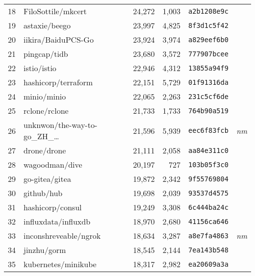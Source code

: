 {\begin{supertabular}{llrrll}
        18  &                 FiloSottile/mkcert & 24,272 &  1,003 &  \texttt{a2b1208e9c} &              \\
        19  &                      astaxie/beego & 23,997 &  4,825 &  \texttt{8f3d1c5f42} &              \\
        20  &                 iikira/BaiduPCS-Go & 23,924 &  3,974 &  \texttt{a829eef6b0} &              \\
        21  &                       pingcap/tidb & 23,680 &  3,572 &  \texttt{777907bcee} &              \\
        22  &                        istio/istio & 22,946 &  4,312 &  \texttt{13855a94f9} &              \\
        23  &                hashicorp/terraform & 22,151 &  5,729 &  \texttt{01f91316da} &              \\
        24  &                        minio/minio & 22,065 &  2,263 &  \texttt{231c5cf6de} &              \\
        25  &                      rclone/rclone & 21,733 &  1,733 &  \texttt{764b90a519} &              \\
        26  &  unknwon/the-way-to-go\_ZH\_\ldots & 21,596 &  5,939 &  \texttt{eec6f83fcb} &  \textit{nm} \\
        27  &                        drone/drone & 21,111 &  2,058 &  \texttt{aa84e311c0} &              \\
        28  &                     wagoodman/dive & 20,197 &    727 &  \texttt{103b05f3c0} &              \\
        29  &                     go-gitea/gitea & 19,872 &  2,342 &  \texttt{9f55769804} &              \\
        30  &                         github/hub & 19,698 &  2,039 &  \texttt{93537d4575} &              \\
        31  &                   hashicorp/consul & 19,249 &  3,308 &  \texttt{6c444ba24c} &              \\
        32  &                influxdata/influxdb & 18,970 &  2,680 &  \texttt{41156ca646} &              \\
        33  &              inconshreveable/ngrok & 18,634 &  3,287 &  \texttt{a8e7fa4863} &  \textit{nm} \\
        34  &                        jinzhu/gorm & 18,545 &  2,144 &  \texttt{7ea143b548} &              \\
        35  &                kubernetes/minikube & 18,317 &  2,982 &  \texttt{ea20609a3a} &              \\

\end{supertabular}}
